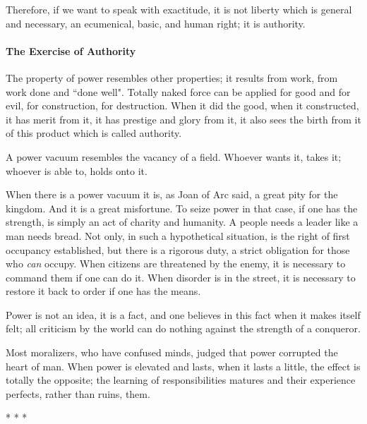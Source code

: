 Therefore, if we want to speak with exactitude, it is not liberty which is general and necessary, an ecumenical, basic, and human right; it is authority.

\paragraph{The Exercise of Authority}

The property of power resembles other properties; it results from work, from work done and ``done well". Totally naked force can be applied for good and for evil, for construction, for destruction. When it did the good, when it constructed, it has merit from it, it has prestige and glory from it, it also sees the birth from it of this product which is called authority.

A power vacuum resembles the vacancy of a field. Whoever wants it, takes it; whoever is able to, holds onto it.

When there is a power vacuum it is, as Joan of Arc said, a great pity for the kingdom. And it is a great misfortune. To seize power in that case, if one has the strength, is simply an act of charity and humanity. A people needs a leader like a man needs bread. Not only, in such a hypothetical situation, is the right of first occupancy established, but there is a rigorous duty, a strict obligation for those who \emph{can} occupy. When citizens are threatened by the enemy, it is necessary to command them if one can do it. When disorder is in the street, it is necessary to restore it back to order if one has the means.

Power is not an idea, it is a fact, and one believes in this fact when it makes itself felt; all criticism by the world can do nothing against the strength of a conqueror.

Most moralizers, who have confused minds, judged that power corrupted the heart of man. When power is elevated and lasts, when it lasts a little, the effect is totally the opposite; the learning of responsibilities matures and their experience perfects, rather than ruins, them.




\begin{center}* * *\end{center}


